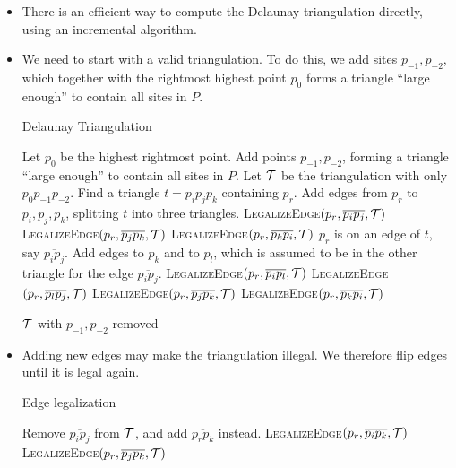 \begin{itemize}
\item There is an efficient way to compute the Delaunay triangulation
  directly, using an incremental algorithm.
\item We need to start with a valid triangulation. To do this, we add
  sites $p_{-1}, p_{-2}$, which together with the rightmost highest
  point $p_0$ forms a triangle ``large enough'' to contain all sites
  in $P$.
\begin{algorithm}
\caption{Delaunay Triangulation}
\begin{algorithmic}[1]

  \State Let $p_0$ be the highest rightmost point.
  \State Add points $p_{-1}, p_{-2}$, forming a triangle ``large
    enough'' to contain all sites in $P$.
  \State Let $\mathcal{T}$ be the triangulation with only $p_0p_{-1}p_{-2}$.
    Find a triangle $t = p_ip_jp_k$ containing $p_r$.
      \State Add edges from $p_r$ to $p_i, p_j, p_k$, splitting $t$ into three triangles.
      \State \textsc{LegalizeEdge}$(p_r, \overline{p_ip_j}, \mathcal{T})$
      \State \textsc{LegalizeEdge}$(p_r, \overline{p_jp_k}, \mathcal{T})$
      \State \textsc{LegalizeEdge}$(p_r, \overline{p_kp_i}, \mathcal{T})$
    \Else
      \Comment $p_r$ is on an edge of $t$, say $\overline{p_ip_j}$.
      \State Add edges to $p_k$ and to $p_l$, which is assumed to be in the other triangle for the edge $\overline{p_ip_j}$.
      \State \textsc{LegalizeEdge}$(p_r, \overline{p_ip_l}, \mathcal{T})$
      \State \textsc{LegalizeEdge}$(p_r, \overline{p_lp_j}, \mathcal{T})$
      \State \textsc{LegalizeEdge}$(p_r, \overline{p_jp_k}, \mathcal{T})$
      \State \textsc{LegalizeEdge}$(p_r, \overline{p_kp_i}, \mathcal{T})$
    \EndIf
  \EndFor

  \Return $\mathcal{T}$ with $p_{-1}, p_{-2}$ removed
\EndProcedure
\end{algorithmic}
\end{algorithm}

\item Adding new edges may make the triangulation illegal. We
  therefore flip edges until it is legal again.

  \begin{algorithm}
    \caption{Edge legalization}
    \begin{algorithmic}[1]
          \State Remove $\overline{p_ip_j}$ from $\mathcal{T}$, and add $\overline{p_rp_k}$ instead.
          \State \textsc{LegalizeEdge}$(p_r, \overline{p_ip_k}, \mathcal{T})$
          \State \textsc{LegalizeEdge}$(p_r, \overline{p_jp_k}, \mathcal{T})$
        \EndIf
      \EndProcedure
    \end{algorithmic}
  \end{algorithm}


\end{itemize}
